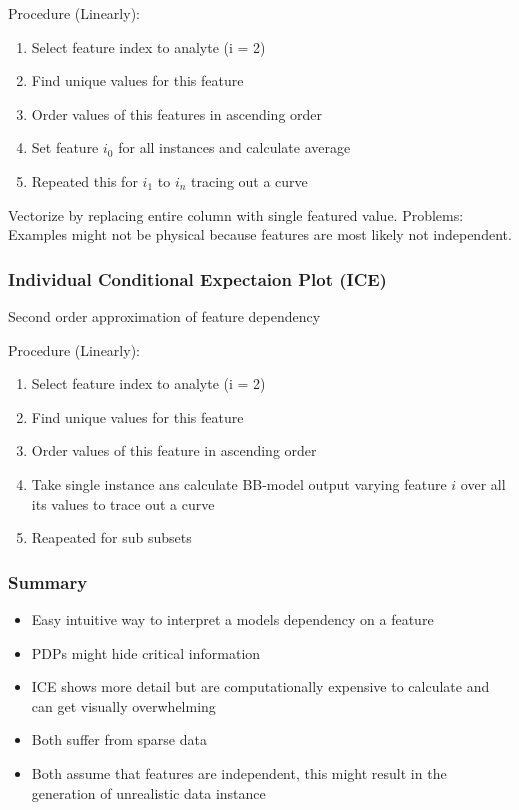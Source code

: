 Procedure (Linearly):
\begin{enumerate}
    \item Select feature index to analyte (i = 2)
    \item Find unique values for this feature
    \item Order values of this features in ascending order
    \item Set feature \(i_0\) for all instances and calculate average
    \item Repeated this for \(i_1\) to \(i_n\) tracing out a curve
\end{enumerate}
Vectorize by replacing entire column with single featured value.
Problems: Examples might not be physical because features are most likely not independent.
\subsubsection{Individual Conditional Expectaion Plot (ICE)}
Second order approximation of feature dependency

Procedure (Linearly):
\begin{enumerate}
    \item Select feature index to analyte (i = 2)
    \item Find unique values for this feature
    \item Order values of this feature in ascending order
    \item Take single instance ans calculate BB-model output varying feature \(i\) over all its values to trace out a curve
    \item Reapeated for sub subsets
\end{enumerate}
\subsubsection{Summary}
\begin{itemize}
    \item Easy intuitive way to interpret a models dependency on a feature
    \item PDPs might hide critical information
    \item ICE shows more detail but are computationally expensive to calculate and can get visually overwhelming
    \item Both suffer from sparse data
    \item Both assume that features are independent, this might result in the generation of unrealistic data instance
\end{itemize}